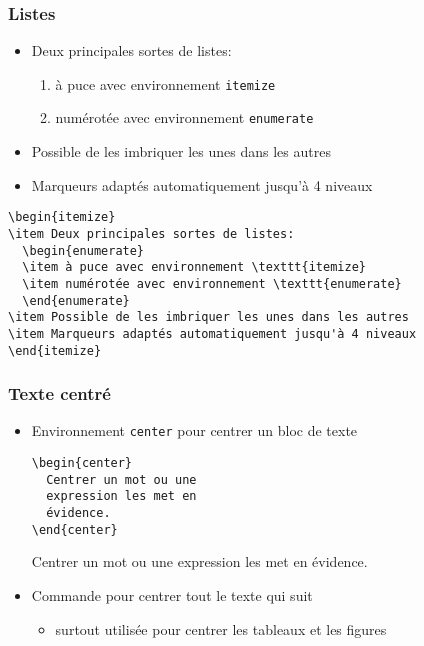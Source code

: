 \begin{frame}[fragile]
  \frametitle{Listes}
  \begin{itemize}
  \item Deux principales sortes de listes:
    \begin{enumerate}
    \item \alert{à puce} avec environnement \texttt{itemize}
    \item \alert{numérotée} avec environnement \texttt{enumerate}
    \end{enumerate}
  \item Possible de les imbriquer les unes dans les autres
  \item Marqueurs adaptés automatiquement jusqu'à 4 niveaux
  \end{itemize}
  \pause

\begin{lstlisting}
\begin{itemize}
\item Deux principales sortes de listes:
  \begin{enumerate}
  \item à puce avec environnement \texttt{itemize}
  \item numérotée avec environnement \texttt{enumerate}
  \end{enumerate}
\item Possible de les imbriquer les unes dans les autres
\item Marqueurs adaptés automatiquement jusqu'à 4 niveaux
\end{itemize}
\end{lstlisting}
\end{frame}

\begin{frame}[fragile=singleslide]
  \frametitle{Texte centré}

  \begin{itemize}
  \item Environnement \texttt{center} pour centrer un bloc de texte
    \begin{demo}
      \begin{eqxample}
\begin{lstlisting}
\begin{center}
  Centrer un mot ou une
  expression les met en
  évidence.
\end{center}
\end{lstlisting}
        \producing
        \begin{center}
          Centrer un mot ou une expression
          les met en évidence.
        \end{center}
      \end{eqxample}
    \end{demo}
  \item Commande  pour centrer tout le texte qui suit
    \begin{itemize}
    \item surtout utilisée pour centrer les tableaux et les figures
    \end{itemize}
  \end{itemize}
\end{frame}

